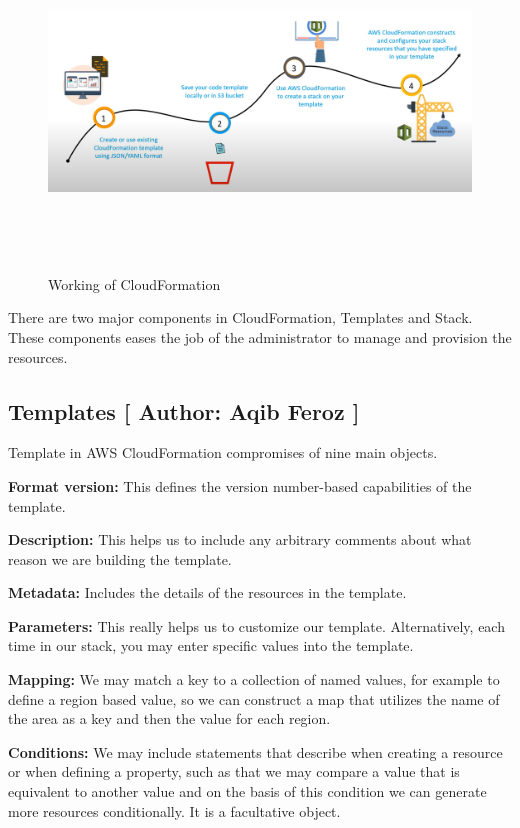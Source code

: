 \begin{figure}[h]
    \centering
    \includegraphics[scale=1.3, width=16cm, height=9cm]{images/Aqib Feroz/clfor.PNG}
    \caption{Working of CloudFormation}
    \label{fig:my_label}
\end{figure}

There are two major components in CloudFormation, Templates and Stack. These components eases the job of the administrator to manage and provision the resources. 
\subsection{Templates [ Author: Aqib Feroz ]}
Template in AWS CloudFormation compromises of nine main objects.

\textbf{Format version:} This defines the version number-based capabilities of the template.

\textbf{Description:} This helps us to include any arbitrary comments about what reason we are building the template.

\textbf{Metadata:} Includes the details of the resources in the template.

\textbf{Parameters:} This really helps us to customize our template. Alternatively, each time in our stack, you may enter specific values into the template.

\textbf{Mapping:} We may match a key to a collection of named values, for example to define a region based value, so we can construct a map that utilizes the name of the area as a key and then the value for each region.

\textbf{Conditions:} We may include statements that describe when creating a resource or when defining a property, such as that we may compare a value that is equivalent to another value and on the basis of this condition we can generate more resources conditionally. It is a facultative object.

